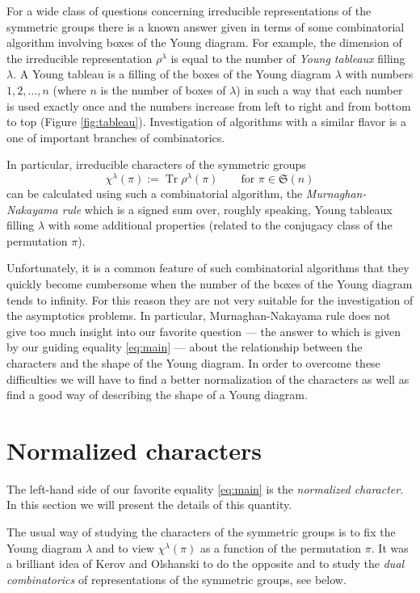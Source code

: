 \documentclass{emsprocart}
\theoremstyle{definition}
\begin{document}
For a wide class of questions concerning irreducible representations of the symmetric 
groups there is a known answer given in terms of some combinatorial algorithm involving boxes of the Young diagram.
For example, the dimension of the irreducible representation $\rho^\lambda$ is equal to the number of \emph{Young 
tableaux} filling $\lambda$. A Young tableau is a filling of the boxes of the Young diagram $\lambda$ with numbers 
$1,2,\dots,n$ (where $n$ is the number of boxes of $\lambda$) in such a way that each number is used exactly once and
the numbers increase from left to right and from bottom to top (Figure \ref{fig:tableau}). Investigation of 
algorithms with a similar flavor is a one of important branches of combinatorics.

In particular, irreducible characters of the symmetric groups
$$ \chi^\lambda(\pi) := \operatorname{Tr} \rho^\lambda(\pi) \qquad \text{for } \pi\in {\mathfrak{S}({n})}$$
can be calculated using such a combinatorial algorithm, the \emph{Murnaghan-Nakayama rule} which is a signed sum over, roughly speaking, Young tableaux filling $\lambda$ with some additional properties (related to the conjugacy class of the permutation $\pi$).

Unfortunately, it is a common feature of such combinatorial algorithms that they quickly become
cumbersome when the number of the boxes of the Young diagram tends to infinity. For this reason they
are not very suitable for the investigation of the asymptotics problems. In particular, Murnaghan-Nakayama rule
does not give too much insight into our favorite question --- the answer to which is given by our guiding
equality \eqref{eq:main} --- about the relationship between the characters and the shape of the Young diagram.
In order to overcome these difficulties we will have to find a better normalization of the characters
as well as find a good way of describing the shape of a Young diagram.

\section{Normalized characters}

The left-hand side of our favorite equality \eqref{eq:main} is the \emph{normalized character}.
In this section we will present the details of this quantity.

The usual way of studying the characters 
of the symmetric groups is to fix the Young diagram $\lambda$ and to view $\chi^\lambda(\pi)$ as a function
of the permutation $\pi$. It was a brilliant idea of Kerov and Olshanski to do the opposite and to study
the \emph{dual combinatorics} of representations of the symmetric groups, see below.
\end{document}
